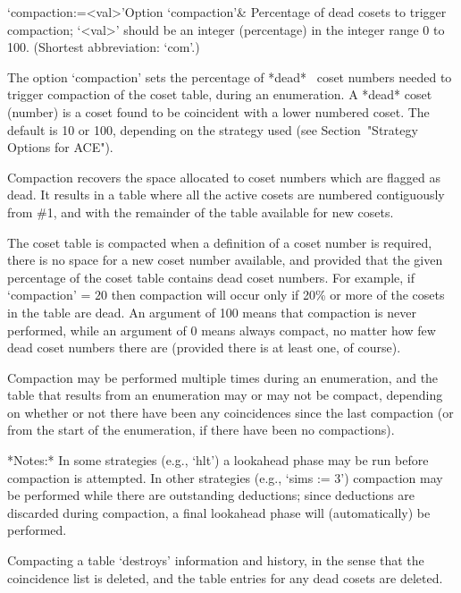 \>`compaction:=<val>'{Option `compaction'}&
Percentage of dead cosets to trigger compaction;
`<val>' should be an integer (percentage) in the integer range 0 to 100.
(Shortest abbreviation: `com'.)

The option `compaction'  sets  the  percentage  of  *dead*~ coset numbers needed  to  trigger  compaction  of  the
coset table, during an enumeration. A *dead* coset (number) is a coset
found to be coincident with a lower numbered coset. The default is  10
or 100, depending on the strategy used (see Section~"Strategy  Options
for ACE").

Compaction recovers the space allocated to  coset  numbers  which  are
flagged as dead. It results in a table where all the active cosets are
numbered contiguously from \#1, and with the remainder  of  the  table
available for new cosets.

The coset table is compacted when a definition of a  coset  number  is
required, there is no space for a  new  coset  number  available,  and
provided that the given percentage of the coset  table  contains  dead
coset numbers. For example, if `compaction'  =  $20$  then  compaction
will occur only if 20\% or more of the cosets in the table  are  dead.
An argument of 100 means that compaction is never performed, while  an
argument of 0 means always compact,  no  matter  how  few  dead  coset
numbers there are (provided there is at least one, of course).

Compaction may be performed  multiple times during an enumeration, and
the table that results from an  enumeration may or may not be compact,
depending on whether or not there have been any coincidences since the
last compaction (or  from the start of the  enumeration, if there have
been no compactions).

*Notes:*
In some strategies (e.g., `hlt') a lookahead phase may be  run  before
compaction is attempted. In  other  strategies  (e.g.,  `sims  :=  3')
compaction may be performed while there  are  outstanding  deductions;
since deductions are discarded during compaction,  a  final  lookahead
phase will (automatically) be performed.

Compacting a table \lq{}destroys'  information  and  history,  in  the
sense that the coincidence list is deleted, and the table entries  for
any dead cosets are deleted.

%
%
%

